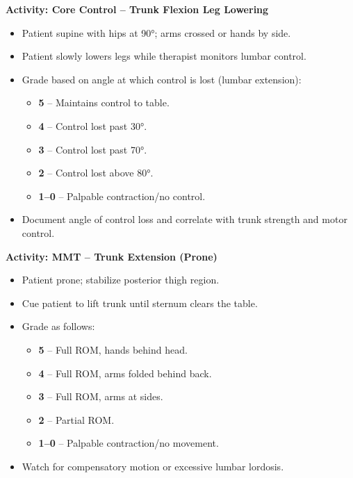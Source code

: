 \begin{labactivitybox}
\textbf{Activity: Core Control – Trunk Flexion Leg Lowering}

\begin{itemize}
  \item Patient supine with hips at 90°; arms crossed or hands by side.
  \item Patient slowly lowers legs while therapist monitors lumbar control.
  \item Grade based on angle at which control is lost (lumbar extension):
    \begin{itemize}
      \item \textbf{5} – Maintains control to table.
      \item \textbf{4} – Control lost past 30°.
      \item \textbf{3} – Control lost past 70°.
      \item \textbf{2} – Control lost above 80°.
      \item \textbf{1–0} – Palpable contraction/no control.
    \end{itemize}
  \item Document angle of control loss and correlate with trunk strength and motor control.
\end{itemize}
\end{labactivitybox}

\begin{labactivitybox}
\textbf{Activity: MMT – Trunk Extension (Prone)}

\begin{itemize}
  \item Patient prone; stabilize posterior thigh region.
  \item Cue patient to lift trunk until sternum clears the table.
  \item Grade as follows:
    \begin{itemize}
      \item \textbf{5} – Full ROM, hands behind head.
      \item \textbf{4} – Full ROM, arms folded behind back.
      \item \textbf{3} – Full ROM, arms at sides.
      \item \textbf{2} – Partial ROM.
      \item \textbf{1–0} – Palpable contraction/no movement.
    \end{itemize}
  \item Watch for compensatory motion or excessive lumbar lordosis.
\end{itemize}
\end{labactivitybox}

